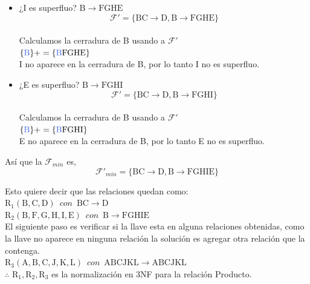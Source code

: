 \documentclass[10pt]{article}
\begin{document}
\begin{itemize}
	\item ¿I es superfluo? $\mathrm{B \rightarrow FGHE}$ \\
	$$\mathcal{F}'=\mathrm{\{ BC \rightarrow D, B \rightarrow FGHE \}}$$\\
	Calculamos la cerradura de B usando a $\mathcal{F}'$\\
	$\mathrm{\{\textcolor{RoyalBlue}{B}\}+= \{\textcolor{RoyalBlue}{B}FGHE\}}$\\
	
	I no aparece en la cerradura de B, por lo tanto I no es superfluo.
	
	\item ¿E es superfluo? $\mathrm{B \rightarrow FGHI}$ \\
	$$\mathcal{F}'=\mathrm{\{ BC \rightarrow D, B \rightarrow FGHI \}}$$\\
	Calculamos la cerradura de B usando a $\mathcal{F}'$\\
	$\mathrm{\{\textcolor{RoyalBlue}{B}\}+= \{\textcolor{RoyalBlue}{B}FGHI\}}$\\
	
	E no aparece en la cerradura de B, por lo tanto E no es superfluo.\\
	
\end{itemize}	
	Así que la $\mathcal{F}_{min}$ es,\\
	
	$$\mathcal{F}'_{min}= \mathrm{\{ BC \rightarrow D, B \rightarrow FGHIE \}}$$
	
	Esto quiere decir que las relaciones quedan como: \\
	
	$\mathrm{R_1(B,C,D)}\,\,\, con \,\,\, \mathrm{ BC \rightarrow D}$\\
	$\mathrm{R_2(B,F, G, H, I, E)}\,\,\, con \,\,\, \mathrm{ B \rightarrow FGHIE}$\\
	
	El siguiente paso es verificar si la llave esta en alguna relaciones obtenidas, como la llave no aparece en ninguna relación la solución es agregar otra relación que la contenga.\\
	
	
	$\mathrm{R_3(A,B,C,J,K,L)}\,\,\, con \,\,\, \mathrm{ ABCJKL \rightarrow ABCJKL}$\\


   $\therefore \,\, \mathrm{R_1, R_2, R_3} $  es la normalización en 3NF para la relación Producto. 
\end{document}
